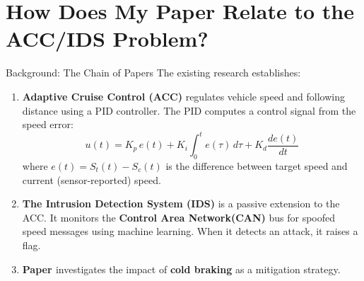 \section{How Does My Paper Relate to the ACC/IDS Problem?}

\begin{contextbox}{Background: The Chain of Papers}
	The existing research establishes:
	\begin{enumerate}[label=\textbf{\arabic*.}]
		\item \textbf{Adaptive Cruise Control (ACC)} regulates vehicle speed and
		      following distance using a PID controller. The PID computes a
		      control signal from the speed error:
		      \[
			      u(t) = K_p\, e(t) + K_i \int_0^t e(\tau)\,d\tau + K_d \frac{de(t)}{dt}
		      \]
		      where $e(t) = S_t(t) - S_c(t)$ is the difference between target speed
		      and current (sensor-reported) speed.
		      
		\item \textbf{The Intrusion Detection System (IDS)} is a passive
		      extension to the ACC. It monitors the \textbf{Control Area Network(CAN)}
		      bus for spoofed speed messages using machine learning. When it
		      detects an attack, it raises a flag.
		      
		\item \textbf{Paper \cite{jedh2023improvement}} investigates the impact of \textbf{cold braking}
		      as a mitigation strategy.
	\end{enumerate}
\end{contextbox}

